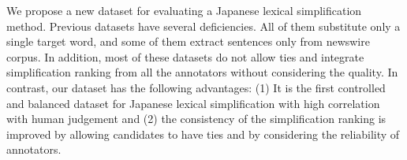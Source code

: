 We propose a new dataset for evaluating a Japanese lexical simplification method. Previous datasets have several deficiencies. All of them substitute only a single target word, and some of them extract sentences only from newswire corpus. In addition, most of these datasets do not allow ties and integrate simplification ranking from all the annotators without considering the quality. In contrast, our dataset has the following advantages: (1) It is the first controlled and balanced dataset for Japanese lexical simplification with high correlation with human judgement and (2) the consistency of the simplification ranking is improved by allowing candidates to have ties and by considering the reliability of annotators.

